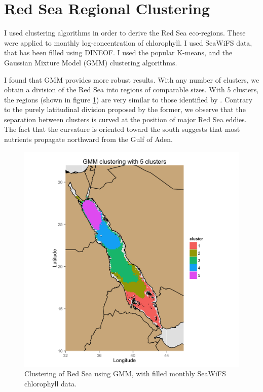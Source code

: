 \section{Red Sea Regional Clustering}

I used clustering algorithms in order to derive the Red Sea eco-regions. These
were applied to monthly log-concentration of chlorophyll. I used SeaWiFS data,
that has been filled using DINEOF. I used the popular K-means, and the Gaussian
Mixture Model (GMM) clustering algorithms.

I found that GMM provides more robust results. With any number of clusters, we
obtain a division of the Red Sea into regions of comparable sizes.  With 5
clusters, the regions (shown in figure \ref{cluster}) are very similar to those identified by
\citet{Raitsos2013}.  Contrary to the purely latitudinal division proposed by
the former, we observe that the separation between clusters is curved at the
position of major Red Sea eddies.  The fact that the curvature is oriented
toward the south suggests that most nutrients propagate northward from the Gulf
of Aden.

\begin{figure}[h]
    \centering
    \includegraphics[scale=.15]{figures/clusters_k5.png}
    \caption{Clustering of Red Sea using GMM, with filled monthly SeaWiFS
             chlorophyll data.}
    \label{cluster}
\end{figure}

